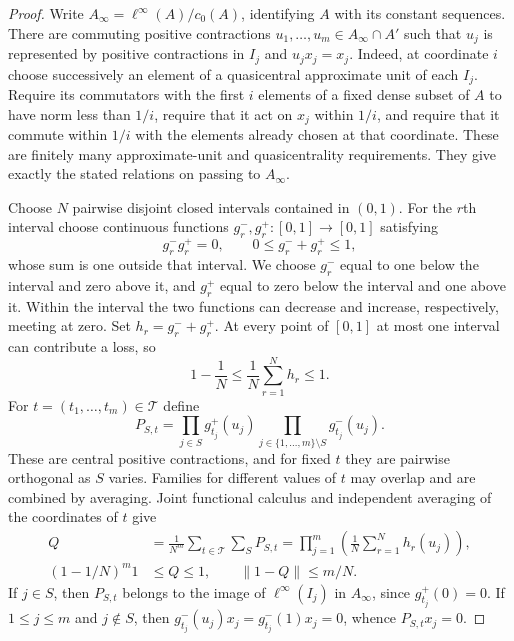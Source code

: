 \begin{proof}
Write $A_\infty=\ell^\infty(A)/c_0(A)$, identifying $A$ with its
constant sequences.  There are commuting positive contractions
$u_1,\ldots,u_m\in A_\infty\cap A'$ such that $u_j$ is represented
by positive contractions in $I_j$ and $u_jx_j=x_j$.  Indeed, at
coordinate $i$ choose successively an element of a quasicentral
approximate unit of each $I_j$.  Require its commutators with the
first $i$ elements of a fixed dense subset of $A$ to have norm less
than $1/i$, require that it act on $x_j$ within $1/i$, and require
that it commute within $1/i$ with the elements already chosen at
that coordinate.  These are finitely many approximate-unit and
quasicentrality requirements.  They give exactly the stated
relations on passing to $A_\infty$.

Choose $N$ pairwise disjoint closed intervals contained in $(0,1)$.
For the $r$th interval choose continuous functions
$g_r^-,g_r^+\colon[0,1]\to[0,1]$ satisfying
\[
 g_r^-g_r^+=0,\qquad
 0\leq g_r^-+g_r^+\leq1,
\]
whose sum is one outside that interval.  We choose $g_r^-$ equal
to one below the interval and zero above it, and $g_r^+$ equal to
zero below the interval and one above it.  Within the interval the
two functions can decrease and increase, respectively, meeting at
zero.  Set $h_r=g_r^-+g_r^+$.  At every point of $[0,1]$ at most
one interval can contribute a loss, so
\begin{equation}
 \label{model:threshold-average}
 1-\frac1N\leq\frac1N\sum_{r=1}^N h_r\leq1.
\end{equation}
For $t=(t_1,\ldots,t_m)\in\mathcal T$ define
\[
 P_{S,t}=
  \prod_{j\in S}g_{t_j}^+(u_j)
  \prod_{j\in\{1,\ldots,m\}\setminus S}g_{t_j}^-(u_j).
\]
These are central positive contractions, and for fixed $t$ they
are pairwise orthogonal as $S$ varies.  Families for different values
of $t$ may overlap and are combined by averaging.  Joint functional
calculus and independent
averaging of the coordinates of $t$ give
\begin{align}
 Q&=\frac1{N^m}\sum_{t\in\mathcal T}\sum_S P_{S,t}
   =\prod_{j=1}^m\left(\frac1N\sum_{r=1}^N h_r(u_j)\right),
       \label{model:mean-slice}\\
 (1-1/N)^m1&\leq Q\leq1,
 \qquad \|1-Q\|\leq m/N.
       \label{model:mean-slice-bound}
\end{align}
If $j\in S$, then $P_{S,t}$ belongs to the image of
$\ell^\infty(I_j)$ in $A_\infty$, since $g_{t_j}^+(0)=0$.
If $1\leq j\leq m$ and $j\notin S$, then
$g_{t_j}^-(u_j)x_j=g_{t_j}^-(1)x_j=0$, whence $P_{S,t}x_j=0$.


\end{proof}

